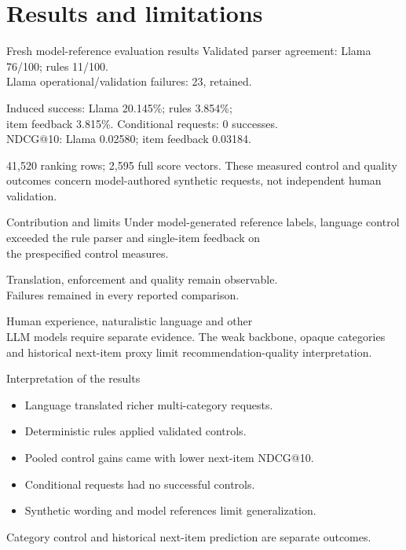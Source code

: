 \documentclass[10pt]{beamer}
\begin{document}
\section{Results and limitations}
\begin{frame}{Fresh model-reference evaluation results}
\small
Validated parser agreement: Llama 76/100; rules 11/100.\\
Llama operational/validation failures: 23, retained.

Induced success: Llama 20.145\%; rules 3.854\%;\\
item feedback 3.815\%. Conditional requests: 0 successes.\\
NDCG@10: Llama 0.02580; item feedback 0.03184.

41,520 ranking rows; 2,595 full score vectors.
\vfill
\tiny These measured control and quality outcomes concern model-authored synthetic requests, not independent human validation.
\end{frame}

\begin{frame}{Contribution and limits}
\small
Under model-generated reference labels, language control\\
exceeded the rule parser and single-item feedback on\\
the prespecified control measures.

Translation, enforcement and quality remain observable.\\
Failures remained in every reported comparison.

Human experience, naturalistic language and other\\
LLM models require separate evidence.
\vfill
\tiny The weak backbone, opaque categories and historical next-item proxy limit recommendation-quality interpretation.
\end{frame}

\begin{frame}{Interpretation of the results}
\small
\begin{itemize}
\item Language translated richer multi-category requests.
\item Deterministic rules applied validated controls.
\item Pooled control gains came with lower next-item NDCG@10.
\item Conditional requests had no successful controls.
\item Synthetic wording and model references limit generalization.
\end{itemize}
\vfill
\tiny Category control and historical next-item prediction are separate outcomes.
\end{frame}
\end{document}
